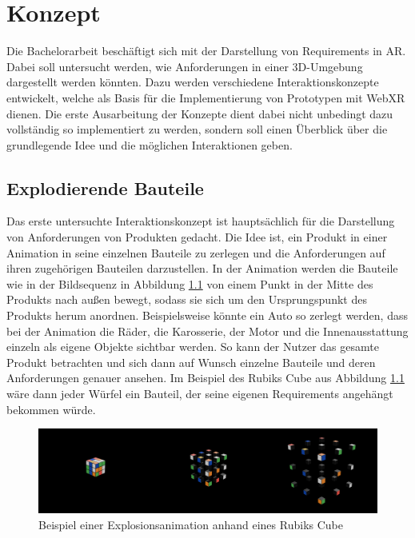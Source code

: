 \chapter{Konzept}
\label{section:konzept}

Die Bachelorarbeit beschäftigt sich mit der Darstellung von Requirements in AR.
Dabei soll untersucht werden, wie Anforderungen in einer 3D-Umgebung dargestellt werden könnten.
Dazu werden verschiedene Interaktionskonzepte entwickelt, welche als Basis für die Implementierung von Prototypen mit WebXR dienen.
Die erste Ausarbeitung der Konzepte dient dabei nicht unbedingt dazu vollständig so implementiert zu werden, sondern soll einen Überblick über die grundlegende Idee und die möglichen Interaktionen geben.

\section{Explodierende Bauteile}

Das erste untersuchte Interaktionskonzept ist hauptsächlich für die Darstellung von Anforderungen von Produkten gedacht.
Die Idee ist, ein Produkt in einer Animation in seine einzelnen Bauteile zu zerlegen und die Anforderungen auf ihren zugehörigen Bauteilen darzustellen.
In der Animation werden die Bauteile wie in der Bildsequenz in Abbildung \ref{fig:rubiks-explosion} von einem Punkt in der Mitte des Produkts nach außen bewegt, sodass sie sich um den Ursprungspunkt des Produkts herum anordnen.
Beispielsweise könnte ein Auto so zerlegt werden, dass bei der Animation die Räder, die Karosserie, der Motor und die Innenausstattung einzeln als eigene Objekte sichtbar werden.
So kann der Nutzer das gesamte Produkt betrachten und sich dann auf Wunsch einzelne Bauteile und deren Anforderungen genauer ansehen.
Im Beispiel des Rubiks Cube aus Abbildung \ref{fig:rubiks-explosion} wäre dann jeder Würfel ein Bauteil, der seine eigenen Requirements angehängt bekommen würde.

\begin{figure}[H]
    \centering
    \includegraphics[width=1\textwidth]{images/RubiksExplosion.png}
    \caption{Beispiel einer Explosionsanimation anhand eines Rubiks Cube}
    \label{fig:rubiks-explosion}
\end{figure}

